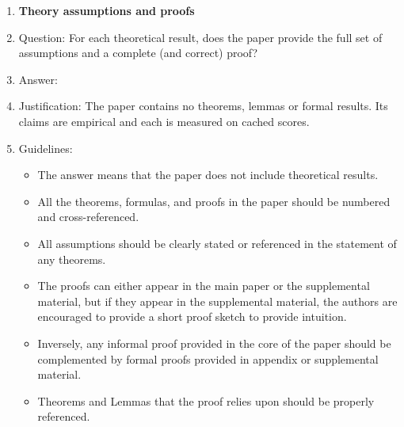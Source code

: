 \begin{enumerate}
\item {\bf Theory assumptions and proofs}
    \item[] Question: For each theoretical result, does the paper provide the full set of assumptions and a complete (and correct) proof?
    \item[] Answer: \answerNA{}
    \item[] Justification: The paper contains no theorems, lemmas or formal results. Its claims are empirical and each is measured on cached scores.
    \item[] Guidelines:
    \begin{itemize}
        \item The answer \answerNA{} means that the paper does not include theoretical results. 
        \item All the theorems, formulas, and proofs in the paper should be numbered and cross-referenced.
        \item All assumptions should be clearly stated or referenced in the statement of any theorems.
        \item The proofs can either appear in the main paper or the supplemental material, but if they appear in the supplemental material, the authors are encouraged to provide a short proof sketch to provide intuition. 
        \item Inversely, any informal proof provided in the core of the paper should be complemented by formal proofs provided in appendix or supplemental material.
        \item Theorems and Lemmas that the proof relies upon should be properly referenced. 
    \end{itemize}


\end{enumerate}
